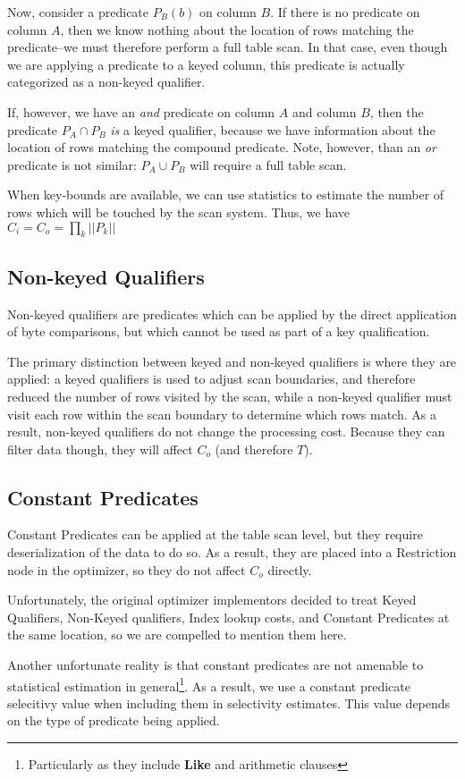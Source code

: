 \documentclass[10pt]{amsart}
\begin{document}
Now, consider a predicate $P_B(b)$ on column $B$. If there is no predicate on column $A$, then we know nothing about the location of rows matching the predicate--we must therefore perform a full table scan. In that case, even though we are applying a predicate to a keyed column, this predicate is actually categorized as a non-keyed qualifier.

If, however, we have an \emph{and} predicate on column $A$ and column $B$, then the predicate $P_A \cap P_B$ \emph{is} a keyed qualifier, because we have information about the location of rows matching the compound predicate. Note, however, than an \emph{or} predicate is not similar: $P_A \cup P_B$ will require a full table scan.

When key-bounds are available, we can use statistics to estimate the number of rows which will be touched by the scan system. Thus, we have $C_i =C_o= \prod_k ||P_k||$

\subsection{Non-keyed Qualifiers}
Non-keyed qualifiers are predicates which can be applied by the direct application of byte comparisons, but which cannot be used as part of a key qualification. 

The primary distinction between keyed and non-keyed qualifiers is where they are applied: a keyed qualifiers is used to adjust scan boundaries, and therefore reduced the number of rows visited by the scan, while a non-keyed qualifier must visit each row within the scan boundary to determine which rows match. As a result, non-keyed qualifiers do not change the processing cost. Because they can filter data though, they will affect $C_o$ (and therefore $T$).

\subsection{Constant Predicates}
Constant Predicates can be applied at the table scan level, but they require deserialization of the data to do so. As a result, they are placed into a Restriction node in the optimizer, so they do not affect $C_o$ directly. 

Unfortunately, the original optimizer implementors decided to treat Keyed Qualifiers, Non-Keyed qualifiers, Index lookup costs, and Constant Predicates at the same location, so we are compelled to mention them here.

Another unfortunate reality is that constant predicates are not amenable to statistical estimation in general\footnote{Particularly as they include \textbf{Like} and arithmetic clauses}. As a result, we use a constant predicate selecitivy value when including them in selectivity estimates. This value depends on the type of predicate being applied.
\end{document}
